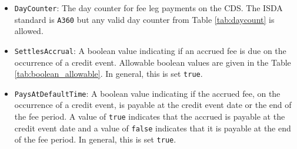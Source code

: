 \begin{itemize}
\item \lstinline!DayCounter!:
The day counter for fee leg payments on the CDS. The ISDA standard is \lstinline!A360! but any valid day counter from Table \ref{tab:daycount} is allowed.

\item \lstinline!SettlesAccrual!:
A boolean value indicating if an accrued fee is due on the occurrence of a credit event. Allowable boolean values are given in the Table \ref{tab:boolean_allowable}. In general, this is set \lstinline!true!.

\item \lstinline!PaysAtDefaultTime!:
A boolean value indicating if the accrued fee, on the occurrence of a credit event, is payable at the credit event date or the end of the fee period. A value of \lstinline!true! indicates that the accrued is payable at the credit event date and a value of \lstinline!false! indicates that it is payable at the end of the fee period. In general, this is set \lstinline!true!.

\end{itemize}

